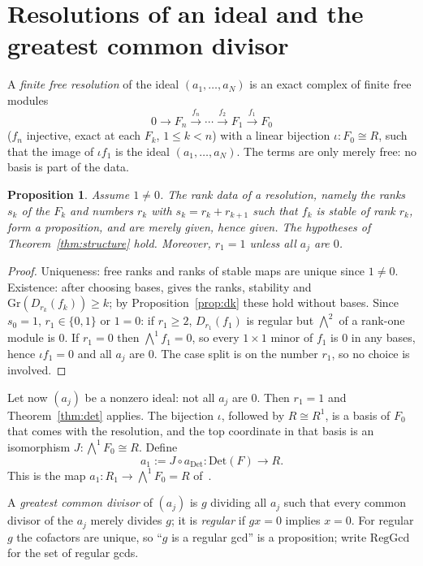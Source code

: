 \documentclass[11pt]{amsart}
\newtheorem{proposition}[theorem]{Proposition}
\theoremstyle{definition}
\theoremstyle{remark}
\newcommand{\Gr}{\mathrm{Gr}}
\newcommand{\Det}{\mathrm{Det}}
\newcommand{\RegGcd}{\mathrm{RegGcd}}
\newcommand{\Ex}{{\textstyle\bigwedge}}
\begin{document}
\section{Resolutions of an ideal and the greatest common divisor}\label{sec:ideal}

A \emph{finite free resolution} of the ideal $(a_1,\dots,a_N)$ is an
exact complex of finite free modules
\[0\to F_n\xrightarrow{f_n}\cdots\xrightarrow{f_2}F_1\xrightarrow{f_1}F_0\]
($f_n$ injective, exact at each $F_k$, $1\le k<n$) with a linear
bijection $\iota:F_0\cong R$, such that the image of $\iota f_1$ is the
ideal $(a_1,\dots,a_N)$.  The terms are only merely free: no basis is part
of the data.

\begin{proposition}\label{prop:ranks}
Assume $1\neq0$.  The rank data of a resolution, namely the ranks $s_k$
of the $F_k$ and numbers $r_k$ with $s_k=r_k+r_{k+1}$ such that $f_k$ is
stable of rank $r_k$, form a proposition, and are merely given, hence
given.  The hypotheses of Theorem~\ref{thm:structure} hold.  Moreover,
$r_1=1$ unless all $a_j$ are $0$.
\end{proposition}

\begin{proof}
Uniqueness: free ranks and ranks of stable maps are unique since
$1\neq0$.  Existence: after choosing bases,
\cite[Theorem~6.8]{CQ} gives the ranks, stability and
$\Gr(D_{r_k}(f_k))\geq k$; by Proposition~\ref{prop:dk} these hold
without bases.  Since $s_0=1$, $r_1\in\{0,1\}$ or $1=0$: if $r_1\geq2$,
$D_{r_1}(f_1)$ is regular but $\Ex^{2}$ of a rank-one module is $0$.  If
$r_1=0$ then $\Ex^1f_1=0$, so every $1\times1$ minor of $f_1$ is $0$ in
any bases, hence $\iota f_1=0$ and all $a_j$ are $0$.  The case split is
on the number $r_1$, so no choice is involved.
\end{proof}

Let now $(a_j)$ be a nonzero ideal: not all $a_j$ are $0$.  Then $r_1=1$
and Theorem~\ref{thm:det} applies.  The bijection $\iota$, followed by
$R\cong R^1$, is a basis of $F_0$ that comes with the resolution, and
the top coordinate in that basis is an isomorphism
$J:\Ex^1F_0\cong R$.  Define
\[a_1:=J\circ a_{\Det}:\Det(F)\to R.\]
This is the map $a_1:R_1\to\Ex^{1}F_0=R$ of~\cite[Theorem~3.1]{BE74}.

A \emph{greatest common divisor} of $(a_j)$ is $g$ dividing all $a_j$ such
that every common divisor of the $a_j$ merely divides $g$; it is
\emph{regular} if $gx=0$ implies $x=0$.  For regular $g$ the cofactors
are unique, so ``$g$ is a regular gcd'' is a proposition; write
$\RegGcd$ for the set of regular gcds.
\end{document}
